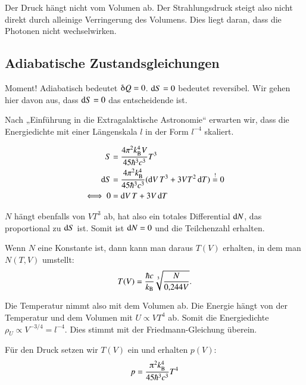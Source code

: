 Der Druck hängt nicht vom Volumen ab. Der Strahlungsdruck steigt also nicht
direkt durch alleinige Verringerung des Volumens. Dies liegt daran, dass die
Photonen nicht wechselwirken.

\subsection{Adiabatische Zustandsgleichungen}

Moment! Adiabatisch bedeutet $\deltaup Q = 0$. $\dif S = 0$ bedeutet
reversibel. Wir gehen hier davon aus, dass $\dif S = 0$ das entscheidende ist.

Nach „Einführung in die Extragalaktische Astronomie“ erwarten wir, dass die
Energiedichte mit einer Längenskala $l$ in der Form $l^{-4}$ skaliert.

\begin{align*}
    S &= \frac{4 \pi^2 \kB^4 V}{45 \hbar^3 c^3} T^3 \\
    \dif S &= \frac{4 \pi^2 \kB^4}{45 \hbar^3 c^3} (\dif V \, T^3 + 3 V T^2 \dif
    T) \overset != 0 \\
    \iff 0 &= \dif V \, T + 3 V \dif T
\end{align*}

$N$ hängt ebenfalls von $V T^3$ ab, hat also ein totales Differential $\dif N$,
das proportional zu $\dif S$ ist. Somit ist $\dif N = 0$ und die Teilchenzahl
erhalten.

Wenn $N$ eine Konstante ist, dann kann man daraus $T(V)$ erhalten, in dem man
$N(T, V)$ umstellt:
\[
    T(V) = \frac{\hbar c}{k_\text B} \sqrt[3]{\frac{N}{\num{0.244} V}}.
\]

Die Temperatur nimmt also mit dem Volumen ab. Die Energie hängt von der
Temperatur und dem Volumen mit $U \propto V T^4$ ab. Somit die Energiedichte
$\rho_U \propto V^{-3/4} = l^{-4}$. Dies stimmt mit der Friedmann-Gleichung
überein.

Für
den Druck setzen wir $T(V)$ ein und erhalten $p(V)$:
\[
    p = \frac{\piup^2 \kB^4}{45 \hbar^3 c^3} T^4
\]

\section{}

\fehlt

\IfFileExists{\bibliographyfile}{
    \printbibliography
}{}



